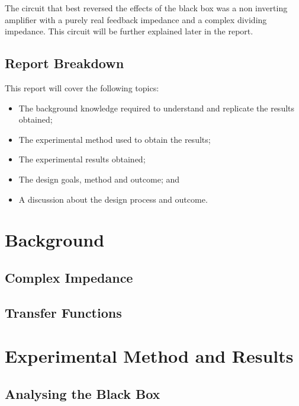 \documentclass[12pt]{article} %
\begin{document}
The circuit that best reversed the effects of the black box was a non inverting amplifier with a purely real feedback impedance and a complex dividing impedance. This circuit will be further explained later in the report.

\subsection{Report Breakdown}

This report will cover the following topics:
\begin{itemize} \itemsep1pt
	\item The background knowledge required to understand and replicate the results obtained;
	\item The experimental method used to obtain the results;
	\item The experimental results obtained;
	\item The design goals, method and outcome; and
	\item A discussion about the design process and outcome.
\end{itemize}

\pagebreak





\section{Background}

\subsection{Complex Impedance}



\subsection{Transfer Functions}


\pagebreak





\section{Experimental Method and Results}

\subsection{Analysing the Black Box}
\end{document}
